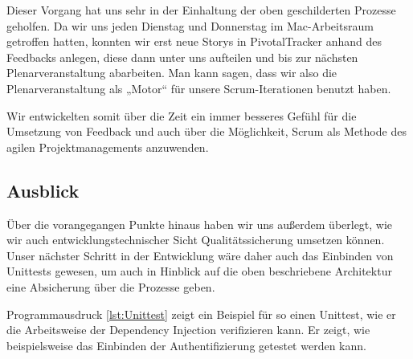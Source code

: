 	Dieser Vorgang hat uns sehr in der Einhaltung der oben geschilderten Prozesse geholfen. Da wir uns jeden Dienstag und Donnerstag im Mac-Arbeitsraum getroffen hatten, konnten wir erst neue Storys in PivotalTracker anhand des Feedbacks anlegen, diese dann unter uns aufteilen und bis zur nächsten Plenarveranstaltung abarbeiten. Man kann sagen, dass wir also die Plenarveranstaltung als „Motor“ für unsere Scrum-Iterationen benutzt haben.
	
	Wir entwickelten somit über die Zeit ein immer besseres Gefühl für die Umsetzung von Feedback und auch über die Möglichkeit, Scrum als Methode des agilen Projektmanagements anzuwenden.

\subsection{Ausblick}
	Über die vorangegangen Punkte hinaus haben wir uns außerdem überlegt, wie wir auch entwicklungstechnischer Sicht Qualitätssicherung umsetzen können. Unser nächster Schritt in der Entwicklung wäre daher auch das Einbinden von Unittests gewesen, um auch in Hinblick auf die oben beschriebene Architektur eine Absicherung über die Prozesse geben.
	
	Programmausdruck \ref{lst:Unittest} zeigt ein Beispiel für so einen Unittest, wie er die Arbeitsweise der Dependency Injection verifizieren kann. Er zeigt, wie beispielsweise das Einbinden der Authentifizierung getestet werden kann.
	
	